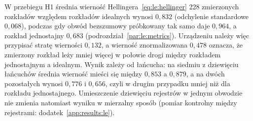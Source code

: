 W przebiegu H1 średnia wierność Hellingera~\eqref{eq:le:hellinger} 228 zmierzonych rozkładów względem rozkładów idealnych wynosi $0{,}832$ (odchylenie standardowe $0{,}068$), podczas gdy obwód bezszumowy próbkowany tak samo daje $0{,}964$, a rozkład jednostajny $0{,}683$ (podrozdział~\ref{par:le:metrics}).
Urządzeniu należy więc przypisać stratę wierności $0{,}132$, a wierność znormalizowana $0{,}478$ oznacza, że zmierzony rozkład leży mniej więcej w połowie drogi między rozkładem jednostajnym a idealnym.
Wynik zależy od łańcucha: na siedmiu z dziewięciu łańcuchów średnia wierność mieści się między $0{,}853$ a $0{,}879$, a na dwóch pozostałych wynosi $0{,}776$ i $0{,}656$, czyli w drugim przypadku mniej niż dla rozkładu jednostajnego.
Umieszczenie dziewięciu rejestrów w jednym obwodzie nie zmienia natomiast wyniku w mierzalny sposób (pomiar kontrolny  między rejestrami: dodatek~\ref{app:results:le}).

